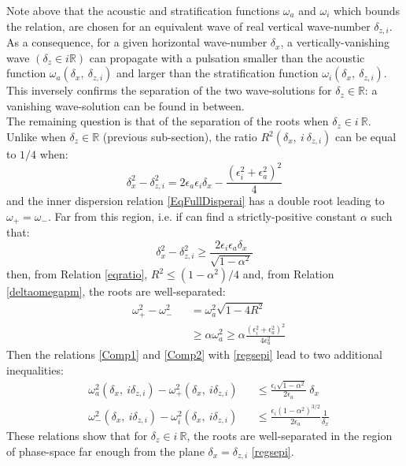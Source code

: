 \documentclass[a4paper,11pt]{article}
\begin{document}
Note above that the acoustic and stratification functions $\omega_a$ and $\omega_i$ which bounds the relation, are chosen for an equivalent wave of real vertical wave-number $\delta_{z,i}$.
As a consequence, for a given horizontal wave-number $\delta_x$, a vertically-vanishing wave $(\delta_z\in i\mathbb{R})$ can propagate with a pulsation smaller than the acoustic function $\omega_{a}(\delta_x,\ \delta_{z,i})$ and larger than the stratification function $\omega_{i}(\delta_x,\ \delta_{z,i})$. This inversely confirms the separation of the two wave-solutions for $\delta_z\in \mathbb{R}$: a vanishing wave-solution can be found in between.\\
The remaining question is that of the separation of the roots when $\delta_z\in i\ \mathbb{R}$. Unlike when $\delta_z\in \mathbb{R}$ (previous sub-section), the ratio $R^2(\delta_x,\ i\ \delta_{z,i})$ can be equal to $1/4$ when:
\begin{equation}
	\delta_x^2-\delta_{z,i}^2=2\epsilon_a\epsilon_i\delta_x 
	-\frac{(\epsilon_i^2+\epsilon_a^2)^2}{4}
\end{equation} 
and the inner dispersion relation \ref{EqFullDisperai} has a double root leading to $\omega_+ = \omega_-$.
Far from this region, i.e. if can find a strictly-positive constant $\alpha$ such that:
\begin{equation}
	\label{regsepi}
	\delta_x^2-\delta_{z,i}^2\geq
	\frac{2\epsilon_i\epsilon_a\delta_x}
	{\sqrt{1-\alpha^2}}
\end{equation}
then, from Relation \ref{eqratio}, $R^2\leq (1-\alpha^2)/4$ and, from Relation \ref{deltaomegapm}, the roots are well-separated:
\begin{subequations}
	\begin{alignat}{2}	
	&\omega_{+}^2-\omega_{-}^2 &&=\omega_a^2\sqrt{1-4 R^2}\\[3mm]
	& &&\geq \alpha\omega_a^2 
	\geq \alpha\frac{(\epsilon_i^2+\epsilon_a^2)^2}{4\epsilon_a^2}
	\end{alignat}
\end{subequations}
Then the relations \ref{Comp1} and \ref{Comp2} with \ref{regsepi} lead to two additional inequalities:
\begin{subequations}
	\begin{alignat}{2}
	\label{Comp1b}
	&\omega_a^2(\delta_x,\ i\delta_{z,i})-\omega_{+}^2(\delta_x,\ i\delta_{z,i})
	&&\leq\frac{\epsilon_i\sqrt{1-\alpha^2}}{2\epsilon_a}\ \delta_x\\[3mm]
	\label{Comp2b}
	&\omega_{-}^2(\delta_x,\ i\delta_{z,i})-\omega_i^2(\delta_x,\ i\delta_{z,i})
	&& \leq\frac{\epsilon_i (1-\alpha^2)^{3/2}}{2\epsilon_a}\frac{1}{\delta_x}
	\end{alignat}	
\end{subequations}
These relations show that for $\delta_z\in i\ \mathbb{R}$, the roots are well-separated in the region of phase-space far enough from the plane $\delta_x=\delta_{z,i}$ \ref{regsepi}.
\end{document}
